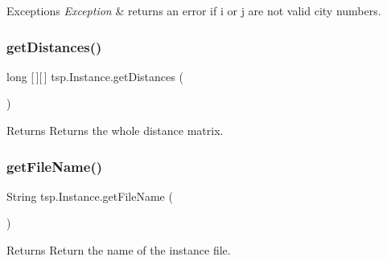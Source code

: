 \begin{DoxyExceptions}{Exceptions}
{\em Exception} & returns an error if i or j are not valid city numbers. \\
\hline
\end{DoxyExceptions}
\mbox{\label{classtsp_1_1_instance_aea035555dcc3a08ab00b87757eb5c128}} 
\subsubsection{\texorpdfstring{get\+Distances()}{getDistances()}\hspace{0.1cm}{\footnotesize\ttfamily [2/2]}}
{\footnotesize\ttfamily long \mbox{[}$\,$\mbox{]}\mbox{[}$\,$\mbox{]} tsp.\+Instance.\+get\+Distances (\begin{DoxyParamCaption}{ }\end{DoxyParamCaption})\hspace{0.3cm}{\ttfamily [inline]}}

\begin{DoxyReturn}{Returns}
Returns the whole distance matrix. 
\end{DoxyReturn}
\mbox{\label{classtsp_1_1_instance_a26abbb00653df23df3f0d360cd3fa3ff}} 
\subsubsection{\texorpdfstring{get\+File\+Name()}{getFileName()}}
{\footnotesize\ttfamily String tsp.\+Instance.\+get\+File\+Name (\begin{DoxyParamCaption}{ }\end{DoxyParamCaption})\hspace{0.3cm}{\ttfamily [inline]}}

\begin{DoxyReturn}{Returns}
Return the name of the instance file. 
\end{DoxyReturn}
\mbox{\label{classtsp_1_1_instance_a71339bdd0942060e28b4fb4e601cf504}} 

